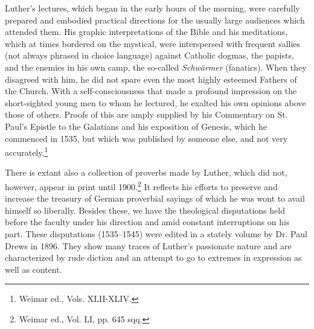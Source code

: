 Luther’s lectures, which began in the early hours of the morning,
were carefully prepared and embodied practical directions for the
usually large audiences which attended them. His graphic interpretations
of the Bible and his meditations, which at times bordered on the
mystical, were interspersed with frequent sallies (not always phrased
in choice language) against Catholic dogmas, the papists, and the
enemies in his own camp, the so-called \textit{Schwärmer} (fanatics). When
they disagreed with him, he did not spare even the most highly esteemed
Fathers of the Church. With a self-consciousness that made a
profound impression on the short-sighted young men to whom he
lectured, he exalted his own opinions above those of others. Proofs
of this are amply supplied by his Commentary on St. Paul’s Epistle to
the Galatians and his exposition of Genesis, which he commenced in
1535, but which was published by someone else, and not very accurately.\footnote{Weimar ed., Vols. XLII-XLIV.}


There is extant also a collection of proverbs made by Luther, which
did not, however, appear in print until 1900.\footnote{Weimar ed., Vol. LI, pp. 645 sqq.}
 It reflects his efforts
to preserve and increase the treasury of German proverbial sayings
of which he was wont to avail himself so liberally. Besides these, we
have the theological disputations held before the faculty under
his direction and amid constant interruptions on his part. These disputations
(1535--1545) were edited in a stately volume by Dr. Paul
Drews in 1896. They show many traces of Luther’s passionate nature
and are characterized by rude diction and an attempt to go to extremes
in expression as well as content.
